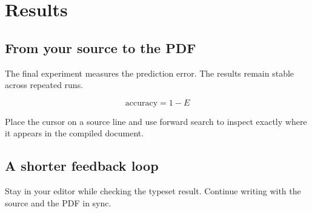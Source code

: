 \section{Results}

\subsection{From your source to the PDF}
The final experiment measures the prediction error.
The results remain stable across repeated runs.

\begin{equation}
  \mathrm{accuracy} = 1 - E
\end{equation}

Place the cursor on a source line and use forward search
to inspect exactly where it appears in the compiled document.

\subsection{A shorter feedback loop}
Stay in your editor while checking the typeset result.
Continue writing with the source and the PDF in sync.
